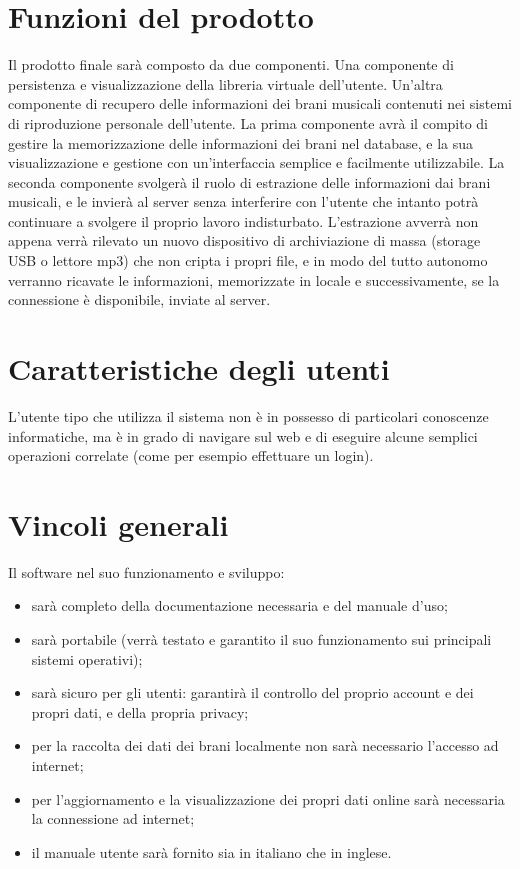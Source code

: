 \section{Funzioni del prodotto}
Il prodotto finale sar\`a composto da due componenti. Una componente di
persistenza e visualizzazione della libreria virtuale dell'utente. Un'altra
componente di recupero delle informazioni dei brani musicali contenuti nei
sistemi di riproduzione personale dell'utente. La prima componente avr\`a il
compito di gestire la memorizzazione delle informazioni dei brani nel database,
e la sua visualizzazione e gestione con un'interfaccia semplice e facilmente
utilizzabile. La seconda componente svolger\`a il ruolo di estrazione delle
informazioni dai brani musicali, e le invier\`a al server senza interferire con
l'utente che intanto potr\`a continuare a svolgere il proprio lavoro indisturbato.
L'estrazione avverr\`a non appena verr\`a rilevato un nuovo dispositivo di
archiviazione di massa (storage USB o lettore mp3) che non cripta i propri file,
e in modo del tutto autonomo verranno ricavate le informazioni, memorizzate in
locale e successivamente, se la connessione \`e disponibile, inviate al server.

\section{Caratteristiche degli utenti}
L'utente tipo che utilizza il sistema non \`e in possesso di particolari
conoscenze informatiche, ma \`e in grado di navigare sul web e di eseguire alcune
semplici operazioni correlate (come per esempio effettuare un login).

\section{Vincoli generali}
Il software nel suo funzionamento e sviluppo:
\begin{itemize}
  \item sar\`a completo della documentazione necessaria e del manuale d'uso;
  \item sar\`a portabile (verr\`a testato e garantito il suo funzionamento sui
  principali sistemi operativi);
  \item sar\`a sicuro per gli utenti: garantir\`a il controllo del proprio account e
  dei propri dati, e della propria privacy;
  \item per la raccolta dei dati dei brani localmente non sar\`a necessario
  l'accesso ad internet;
  \item per l'aggiornamento e la visualizzazione dei propri dati online sar\`a
  necessaria la connessione ad internet;
  \item il manuale utente sar\`a fornito sia in italiano che in inglese.
\end{itemize}


